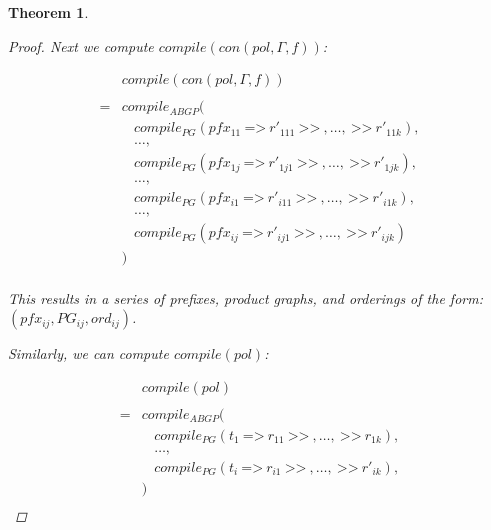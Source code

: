 \documentclass[twocolumn, openany]{sig-alternate-10pt}
\newcommand{\Prefer}{\texttt{>>}}
\newcommand{\Path}{\texttt{=>}}
\newtheorem{thm}{Theorem}
\begin{document}
\begin{thm}
\begin{proof}
    Next we compute $compile(con(pol,\Gamma,f))$:

    \[ \begin{array}{ll}
        & compile(con(pol,\Gamma,f))  \\
                          & \\
                         =& compile_{ABGP}( \\
                          &  ~~~~ compile_{PG}(pfx_{11} ~\Path~ r'_{111} ~\Prefer~,\dots, ~\Prefer~ r'_{11k} ), \\
                          &  ~~~~ \dots, \\
                          &  ~~~~ compile_{PG}(pfx_{1j} ~\Path~ r'_{1j1} ~\Prefer~,\dots, ~\Prefer~ r'_{1jk} ), \\
                          &  ~~~~ \dots, \\
                          &  ~~~~ compile_{PG}(pfx_{i1} ~\Path~ r'_{i11} ~\Prefer~,\dots, ~\Prefer~ r'_{i1k} ), \\
                          &  ~~~~ \dots, \\
                          &  ~~~~ compile_{PG}(pfx_{ij} ~\Path~ r'_{ij1} ~\Prefer~,\dots, ~\Prefer~ r'_{ijk} ) \\
                          &  ) \\
    \end{array} \]
 
    \vspace{.5em}
    This results in a series of prefixes, product graphs, and orderings of the form: $(pfx_{ij}, PG_{ij}, ord_{ij})$.

    \vspace{1em}
    Similarly, we can compute $compile(pol)$:

    \[ \begin{array}{ll}
        & compile(pol)  \\
                      & \\
                     =& compile_{ABGP}( \\
                      & ~~~~ compile_{PG}(t_1 ~\Path~ r_{11} ~\Prefer~,\dots, ~\Prefer~ r_{1k} ), \\
                      & ~~~~ \dots, \\
                      & ~~~~ compile_{PG}(t_i ~\Path~ r_{i1} ~\Prefer~,\dots, ~\Prefer~ r'_{ik} ), \\
                      & ) \\
    \end{array} \]


\end{proof}
\end{thm}
\end{document}
